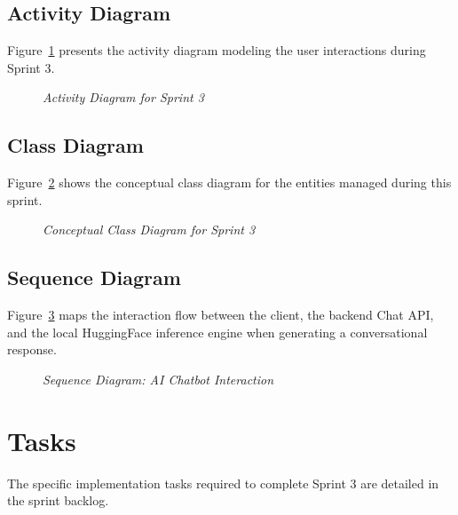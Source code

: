 \subsection{Activity Diagram}
Figure~\ref{fig:sprint3_activity} presents the activity diagram modeling the user interactions during Sprint 3.

\begin{figure}[H]
	\centering
	\caption{\textit{Activity Diagram for Sprint 3}}
	\label{fig:sprint3_activity}
\end{figure}

\subsection{Class Diagram}
Figure~\ref{fig:sprint3_class} shows the conceptual class diagram for the entities managed during this sprint.

\begin{figure}[H]
	\centering
	\caption{\textit{Conceptual Class Diagram for Sprint 3}}
	\label{fig:sprint3_class}
\end{figure}

\subsection{Sequence Diagram}
Figure~\ref{fig:sprint3_seq_chat} maps the interaction flow between the client, the backend Chat API, and the local HuggingFace inference engine when generating a conversational response.

\begin{figure}[H]
	\centering
	\caption{\textit{Sequence Diagram: AI Chatbot Interaction}}
	\label{fig:sprint3_seq_chat}
\end{figure}

\section{Tasks}
The specific implementation tasks required to complete Sprint 3 are detailed in the sprint backlog.

